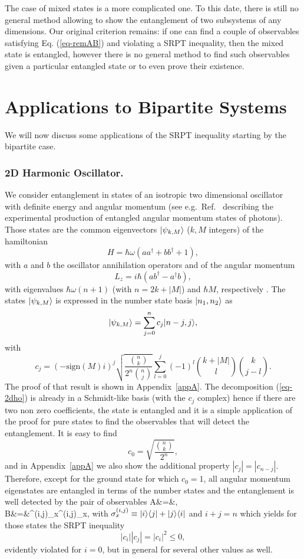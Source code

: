The case of mixed states is a more complicated one. To this date, there is still no general method allowing to show the entanglement of two subsystems of any dimensions. Our original criterion remains: if one can find a couple of observables satisfying Eq. (\ref{eq-remAB}) and violating a SRPT inequality, then the mixed state is entangled, however there is no general method to find such observables given a particular entangled state or to even prove their existence.

\section{Applications to Bipartite Systems}  \label{sec-SPRTbip}

We will now discuss some applications of the SRPT inequality starting by the bipartite case.

\subsubsection{2D Harmonic Oscillator.}

We consider entanglement in states of an isotropic two dimensional oscillator with definite energy and angular momentum (see e.g.~Ref.~\cite{Mai01} describing the experimental production of entangled angular momentum states of photons). Those states are the common eigenvectors $| \psi_{k,M} \rangle$ ($k, M$ integers) of the hamiltonian
\[ H=\hbar \omega(a a^\dagger + b b^\dagger +1),\]
with $a$ and $b$ the oscillator annihilation operators and of the angular momentum
\[ L_z = i \hbar (a b^\dagger - a^\dagger b),\]
with eigenvalues $\hbar \omega(n+1)$ (with $n=2k + |M|$) and $\hbar M$, respectively . The states $| \psi_{k,M} \rangle$ is expressed in the number state basis $| n_1,n_2 \rangle$ as
\[ | \psi_{k,M} \rangle = \sum_{j=0}^{n}c_j | n-j,j \rangle,\label{eq-2dho}\]
with
\[ c_j =  \left(- \textrm{sign}(M) i \right)^j  \sqrt{\frac{\binom{n}{k} }{2^n \binom{n}{j}}}    \sum_{l=0}^{j}(-1)^l \binom{k+|M|}{l} \binom{k}{j-l} . \]
The proof of that result is shown in Appendix~\ref{appA}. The decomposition (\ref{eq-2dho}) is already in a Schmidt-like basis (with the $c_j$ complex) hence if there are two non zero coefficients, the state is entangled and it is a simple application of the proof for pure states to find the observables that will detect the entanglement. It is easy to find
\[ c_0 = \sqrt{\frac{\binom{n}{k} }{2^n}}, \]
and in Appendix~\ref{appA} we also show the additional property $|c_j|=|c_{n-j}|$. Therefore, except for the ground state for which $c_0=1$, all angular momentum eigenstates are entangled in terms of the number states and the entanglement is well detected by the pair of observables
\bea
A&=&, \\  B&=&\sigma^{(i,j)}_x\otimes\sigma^{(i,j)}_x, \label{eq-AB2D}
\eea
with $\sigma_x^{(i,j)} \equiv | i \rangle \langle j | +| j \rangle \langle i |$ and $i+j =n$ which yields for those states the SRPT inequality
\[ |c_i||c_j|=|c_i|^2 \le 0 ,\]
evidently violated for $i=0$, but in general for several other values as well.


